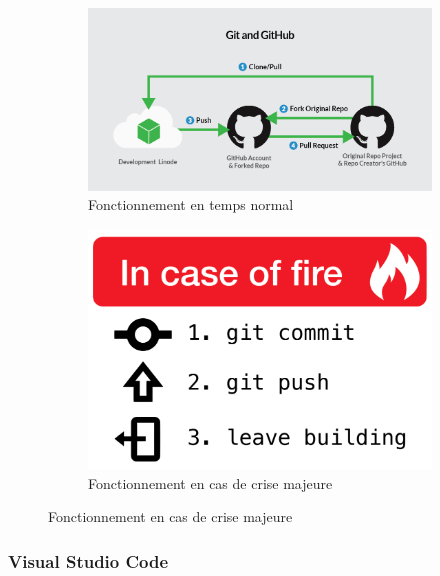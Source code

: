 \documentclass{article}
\begin{document}
\begin{figure}[h!]
	\centering
  	\begin{subfigure}[b]{0.68\linewidth}
	\includegraphics[width=\linewidth]{githubf.png}
	\caption{Fonctionnement en temps normal}
  	\end{subfigure}
	\begin{subfigure}[b]{0.3\linewidth}
	\includegraphics[width=\linewidth]{gitf.png}
	\caption{Fonctionnement en cas de crise majeure}
  \end{subfigure}
\end{figure}

\newpage
\subsubsection{Visual Studio Code}
\end{document}
